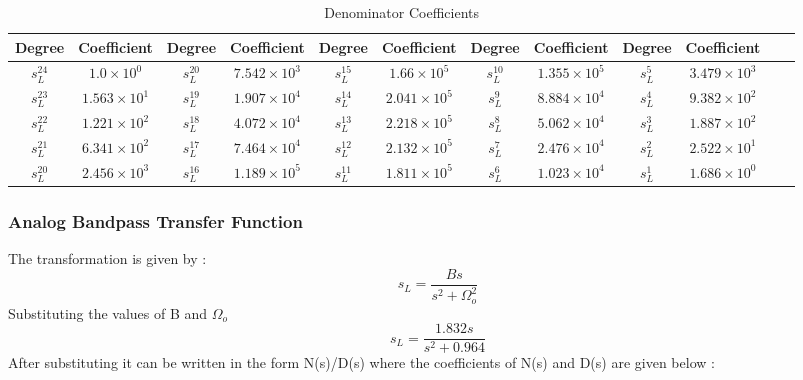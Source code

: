 \documentclass{article}
\begin{document}
\begin{table}[H]
  \centering
		\begin{adjustwidth}{-2.5cm}{}
		\caption{Denominator Coefficients}
		\begin{tabular}{|c|c|c|c|c|c|c|c|c|c|c|c|}
\hline
Degree & Coefficient & Degree & Coefficient & Degree & Coefficient & Degree & Coefficient & Degree & Coefficient\\
\hline
$s_L^{ 24 }$ & $ 1.0 \times 10^{ 0 }$ & $s_L^{ 20 }$ & $ 7.542 \times 10^{ 3 }$ & $s_L^{ 15 }$ & $ 1.66 \times 10^{ 5 }$  & $s_L^{ 10 }$ & $ 1.355 \times 10^{ 5 }$ & $s_L^{ 5 }$ & $ 3.479 \times 10^{ 3 }$ \\
\hline
$s_L^{ 23 }$ & $ 1.563 \times 10^{ 1 }$ & $s_L^{ 19 }$ & $ 1.907 \times 10^{ 4 }$ & $s_L^{ 14 }$ & $ 2.041 \times 10^{ 5 }$  & $s_L^{ 9 }$ & $ 8.884 \times 10^{ 4 }$ & $s_L^{ 4 }$ & $ 9.382 \times 10^{ 2 }$ \\
\hline
$s_L^{ 22 }$ & $ 1.221 \times 10^{ 2 }$ & $s_L^{ 18 }$ & $ 4.072 \times 10^{ 4 }$ & $s_L^{ 13 }$ & $ 2.218 \times 10^{ 5 }$  & $s_L^{ 8 }$ & $ 5.062 \times 10^{ 4 }$ & $s_L^{ 3 }$ & $ 1.887 \times 10^{ 2 }$ \\
\hline
$s_L^{ 21 }$ & $ 6.341 \times 10^{ 2 }$ & $s_L^{ 17 }$ & $ 7.464 \times 10^{ 4 }$ & $s_L^{ 12 }$ & $ 2.132 \times 10^{ 5 }$  & $s_L^{ 7 }$ & $ 2.476 \times 10^{ 4 }$ & $s_L^{ 2 }$ & $ 2.522 \times 10^{ 1 }$ \\
\hline
$s_L^{ 20 }$ & $ 2.456 \times 10^{ 3 }$ & $s_L^{ 16 }$ & $ 1.189 \times 10^{ 5 }$ & $s_L^{ 11 }$ & $ 1.811 \times 10^{ 5 }$  & $s_L^{ 6 }$ & $ 1.023 \times 10^{ 4 }$ & $s_L^{ 1 }$ & $ 1.686 \times 10^{ 0 }$ \\
\hline
  	\end{tabular}
	\end{adjustwidth}
\end{table}
\subsubsection{Analog Bandpass Transfer Function}
The transformation is given by :
\begin{equation*}
    s_L = \frac{Bs}{s^2 + \Omega_o^2 }
\end{equation*}
Substituting the values of B and $\Omega_o$
\begin{equation*}
    s_L = \frac{1.832s}{s^2 + 0.964}
\end{equation*}
After substituting it can be written in the form N(s)/D(s) where the coefficients of N(s) and D(s) are given below :
\end{document}
